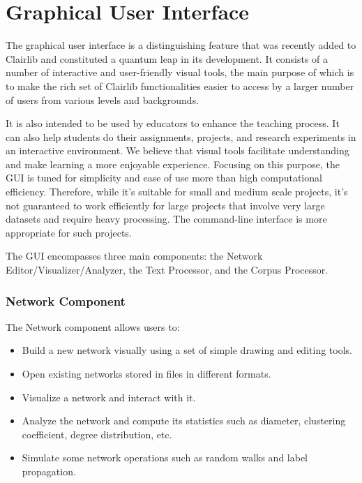 \section{Graphical User Interface}

The graphical user interface is a distinguishing feature that was recently added to Clairlib and constituted a quantum leap in its development. It consists of a number of interactive and user-friendly visual tools, the main purpose of which is to make the rich set of Clairlib functionalities easier to access by a larger number of users from various levels and backgrounds.

It is also intended to be used by educators to enhance the teaching process. It can also help students do their assignments, projects, and research experiments in an interactive environment. We believe that visual tools facilitate understanding and make learning a more enjoyable experience. Focusing on this purpose, the GUI is tuned for simplicity and ease of use more than high computational efficiency. Therefore, while it's suitable for small and medium scale projects, it's not guaranteed to work efficiently for large projects that involve very large datasets and require heavy processing. The command-line interface is more appropriate for such projects.

The GUI encompasses three main components: the Network Editor/Visualizer/Analyzer, the Text Processor, and the Corpus Processor. 

\subsubsection{Network Component}

The Network component allows users to:
  
\begin{itemize}
  \item Build a new network visually using a set of simple drawing and editing tools.
  \item Open existing networks stored in files in different formats.
  \item Visualize a network and interact with it.
  \item Analyze the network and compute its statistics such as diameter, clustering coefficient, degree distribution, etc.
  \item Simulate some network operations such as random walks and label propagation.
\end{itemize}


